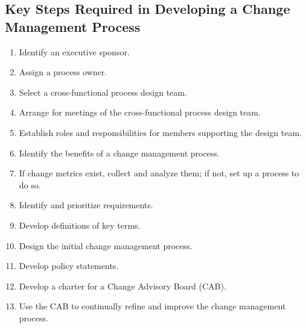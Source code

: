 \documentclass[8pt,a4]{extarticle}
\begin{document}
\begin{multicols}{3}
\subsection{Key Steps Required in Developing a Change Management Process}
\begin{enumerate}
\item Identify an executive sponsor.
\item Assign a process owner.
\item Select a cross-functional process design team.
\item Arrange for meetings of the cross-functional process design team.
\item Establish roles and responsibilities for members supporting the design team.
\item Identify the benefits of a change management process.
\item If change metrics exist, collect and analyze them; if not, set up a process to do so.
\item Identify and prioritize requirements.
\item Develop definitions of key terms.
\item Design the initial change management process.
\item Develop policy statements.
\item Develop a charter for a Change Advisory Board (CAB).
\item Use the CAB to continually refine and improve the change management process.
\end{enumerate}


\end{multicols}
\end{document}
